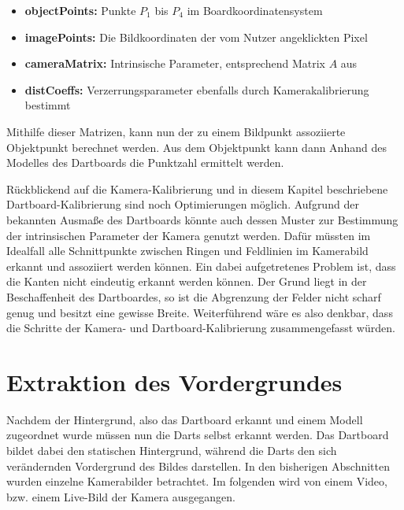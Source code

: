 \begin{itemize}
\item \textbf{objectPoints:} Punkte $P_1$ bis $P_4$ im Boardkoordinatensystem
\item \textbf{imagePoints:} Die Bildkoordinaten der vom Nutzer angeklickten Pixel
\item \textbf{cameraMatrix:} Intrinsische Parameter, entsprechend Matrix $A$ aus 
\item \textbf{distCoeffs:} Verzerrungsparameter ebenfalls durch Kamerakalibrierung bestimmt 
\end{itemize}
Mithilfe dieser Matrizen, kann nun der zu einem Bildpunkt assoziierte Objektpunkt berechnet werden. Aus dem Objektpunkt kann dann Anhand des Modelles des Dartboards die Punktzahl ermittelt werden. 

Rückblickend auf die Kamera-Kalibrierung und in diesem Kapitel beschriebene Dartboard-Kalibrierung sind noch Optimierungen möglich. Aufgrund der bekannten Ausmaße des Dartboards könnte auch dessen Muster zur Bestimmung der intrinsischen Parameter der Kamera  genutzt werden. Dafür müssten im Idealfall alle Schnittpunkte zwischen Ringen und Feldlinien im Kamerabild erkannt und assoziiert werden können. Ein dabei aufgetretenes Problem ist, dass die Kanten nicht eindeutig erkannt werden können. Der Grund liegt in der Beschaffenheit des Dartboardes, so ist die Abgrenzung der Felder nicht scharf genug und besitzt eine gewisse Breite. Weiterführend wäre es also denkbar, dass die Schritte der Kamera- und Dartboard-Kalibrierung zusammengefasst würden. 



\section{Extraktion des Vordergrundes}
\label{sec:substraction}
Nachdem der Hintergrund, also das Dartboard erkannt und einem Modell zugeordnet wurde müssen nun die Darts selbst erkannt werden. Das Dartboard bildet dabei den statischen Hintergrund, während die Darts den sich verändernden Vordergrund des Bildes darstellen. 
In den bisherigen Abschnitten wurden einzelne Kamerabilder betrachtet. Im folgenden wird von einem Video, bzw. einem Live-Bild der Kamera ausgegangen.

